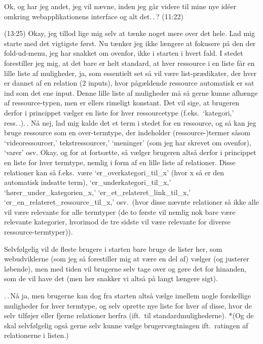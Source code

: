 \documentclass{report}
\begin{document}
Ok, og har jeg andet, jeg vil nævne, inden jeg går videre til mine nye idéer omkring webapplikationens interface og alt det.\,.\,? (11:22)


(13:25) Okay, jeg tillod lige mig selv at tænke noget mere over det hele. Lad mig starte med det vigtigste først. Nu tænker jeg ikke længere at fokusere på den der fold-ud-menu, jeg har snakket om ovenfor, ikke i starten i hvert fald. %
I stedet forestiller jeg mig, at det bare er helt standard, at hver ressource i en liste får en lille liste af muligheder, ja, som essentielt set så vil være list-prædikater, der hver er dannet af en relation (2 inputs), hvor pågældende ressource automatisk er sat ind som det ene input. Denne lille liste af muligheder må så gerne kunne afhænge af ressource-typen, men er ellers rimeligt konstant. Det vil sige, at brugeren derfor i princippet vælger en liste for hver ressourcetype (f.eks.\ `kategori,' ress.\,.).\,. Nå nej, lad mig kalde det et term i stedet for en ressource, og så kan jeg bruge ressource som en over-termtype, der indeholder (ressource-)termer såsom `videoressourcer,' tekstressourcer,' `meninger' (som jeg har skrevet om ovenfor), `varer' osv. Okay, og for at fortsætte, så vælger brugeren altså derfor i princippet en liste for hver termtype, nemlig i form af en lille liste af relationer. Disse relationer kan så f.eks.\ være `er\_overkategori\_til\_x' (hvor x så er den automatisk indsatte term), `er\_underkategori\_til\_x,' `hører\_under\_kategorien\_x,' `er\_et\_relateret\_link\_til\_x,' `er\_en\_relateret\_ressource\_til\_x,' osv.\ (hvor disse nævnte relationer så ikke alle vil være relevante for alle termtyper (de to første vil nemlig nok bare være relevante kategorier, hvorimod de tre sidste vil være relevante for diverse ressource-termtyper)). 

Selvfølgelig vil de fleste brugere i starten bare bruge de lister her, som webudviklerne (som jeg så forestiller mig at være en del af) vælger (og justerer løbende), men med tiden vil brugerne selv tage over og gøre det for hinanden, som de vil have det (men her snakker vi altså på langt længere sigt). 

.\,.\,Nå ja, men brugerne kan dog fra starten altså vælge imellem nogle forskellige muligheder for hver termtype, og selv oprette nye liste for hver af disse, hvor de selv tilføjer eller fjerne relationer herfra (ift.\ til standardmulighederne). *(Og de skal selvfølgelig også gerne selv kunne vælge brugervægtningen ift.\ ratingen af relationerne i listen.)
\end{document}

